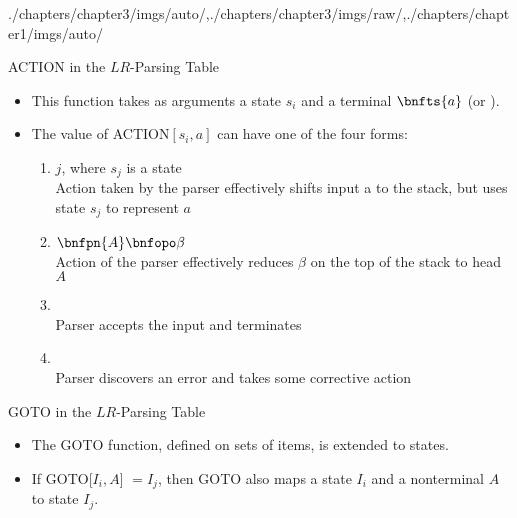 \begin{graphicspathcontext}{{./chapters/chapter3/imgs/auto/},{./chapters/chapter3/imgs/raw/},{./chapters/chapter1/imgs/auto/}}
\begin{bibunit}[apalike]
\begin{frame}[background=9]{ACTION in the $LR$-Parsing Table}
	\begin{itemize}
	\item This function takes as arguments a state $s_i$ and a terminal $\bnfts{a}$ (or ).
	\vfill
	\item The value of ACTION$[s_i,a]$ can have one of the four forms:
		\begin{enumerate}
		\item {} $j$, where $s_j$ is a state \\
			Action taken by the parser effectively shifts input a to the stack, but uses state $s_j$ to represent $a$
		\item {} $\bnfpn{A} \bnfopo \beta$ \\
			Action of the parser effectively reduces $\beta$ on the top of the stack to head $A$
		\item {} \\
			Parser accepts the input and terminates
		\item {} \\
			Parser discovers an error and takes some corrective action
		\end{enumerate}
	\end{itemize}
\end{frame}

\begin{frame}[background=6]{GOTO in the $LR$-Parsing Table}
	\begin{itemize}
	\item The GOTO function, defined on sets of items, is extended to states.
	\vspace{1cm}
	\item If GOTO[$I_i,A$] $= I_j$, then GOTO also maps a state $I_i$ and a nonterminal $A$ to state $I_j$.
	\end{itemize}
\end{frame}


\end{bibunit}
\end{graphicspathcontext}
